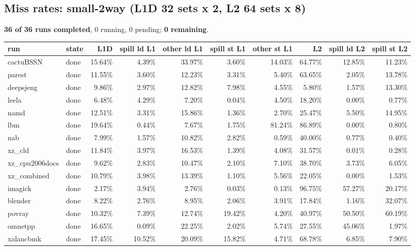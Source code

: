\documentclass[10pt,a4paper,landscape]{article}
\begin{document}
\subsection*{Miss rates: small-2way (L1D 32 sets x 2, L2 64 sets x 8)}
\textbf{36 of 36 runs completed}, 0 running, 0 pending; \textbf{0 remaining}.\par
{\footnotesize
\begin{longtable}{llrrrrrrrr}
\toprule
run & state & L1D & spill ld L1 & other ld L1 & spill st L1 & other st L1 & L2 & spill ld L2 & spill st L2 \\
\midrule
\endhead
\bottomrule
\endfoot
cactuBSSN & done & 15.64\% & 4.39\% & 33.97\% & 3.60\% & 14.03\% & 64.77\% & 12.85\% & 11.23\% \\
parest & done & 11.55\% & 3.60\% & 12.23\% & 3.31\% & 5.40\% & 63.65\% & 2.05\% & 13.78\% \\
deepsjeng & done & 9.86\% & 2.97\% & 12.82\% & 7.98\% & 4.55\% & 5.80\% & 1.57\% & 13.30\% \\
leela & done & 6.48\% & 4.29\% & 7.20\% & 0.04\% & 4.50\% & 18.20\% & 0.00\% & 0.77\% \\
namd & done & 12.51\% & 3.31\% & 15.86\% & 1.36\% & 2.70\% & 25.47\% & 5.50\% & 14.95\% \\
lbm & done & 19.64\% & 0.44\% & 7.67\% & 1.75\% & 81.24\% & 86.89\% & 0.00\% & 0.80\% \\
nab & done & 7.99\% & 1.57\% & 10.82\% & 2.82\% & 0.59\% & 40.00\% & 0.77\% & 0.40\% \\
xz\_cld & done & 11.84\% & 3.97\% & 16.53\% & 1.39\% & 4.08\% & 31.57\% & 0.01\% & 0.28\% \\
xz\_cpu2006docs & done & 9.62\% & 2.83\% & 10.47\% & 2.10\% & 7.10\% & 38.70\% & 3.73\% & 6.05\% \\
xz\_combined & done & 10.79\% & 3.98\% & 13.39\% & 1.10\% & 5.56\% & 22.05\% & 0.00\% & 1.53\% \\
imagick & done & 2.17\% & 3.94\% & 2.76\% & 0.03\% & 0.13\% & 96.75\% & 57.27\% & 20.17\% \\
blender & done & 8.22\% & 2.76\% & 8.95\% & 2.06\% & 3.91\% & 17.84\% & 1.16\% & 32.07\% \\
povray & done & 10.32\% & 7.39\% & 12.74\% & 19.42\% & 4.20\% & 40.97\% & 50.50\% & 60.19\% \\
omnetpp & done & 16.65\% & 0.09\% & 22.25\% & 2.02\% & 5.74\% & 27.55\% & 45.06\% & 1.97\% \\
xalancbmk & done & 17.45\% & 10.52\% & 20.09\% & 15.82\% & 4.71\% & 68.78\% & 6.85\% & 7.90\% \\

\end{longtable}}
\end{document}
